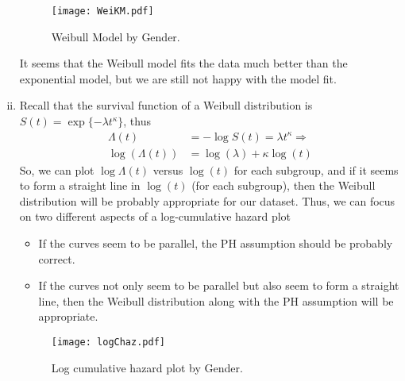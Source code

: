 \begin{enumerate}[(i)]
\begin{figure}[htbp]
	\centering
		\texttt{[image: WeiKM.pdf]}
	\caption{Weibull Model by Gender.}
	\label{figure2}
\end{figure}
It seems that the Weibull model fits the data much better than the exponential model, but we are still not happy with the model fit.
\item Recall that the survival function of a Weibull distribution is
$S(t) = \exp\{-\lambda t^{\kappa}\}$, thus
\begin{align}
\Lambda(t) &= - \log S(t) = \lambda t^{\kappa} \Rightarrow \nonumber \\
\log(\Lambda(t)) &= \log(\lambda) + \kappa\log(t) \nonumber
\end{align}
So, we can plot $\log\Lambda(t)$ versus $\log(t)$ for each subgroup, and if it seems to form a straight line in $\log(t)$ (for each subgroup), then the Weibull distribution will be probably appropriate
for our dataset. 
Thus, we can focus on two different aspects of a log-cumulative hazard plot
\begin{itemize}
\item If the curves seem to be parallel, the PH assumption should be probably correct.
\item If the curves not only seem to be parallel but also seem to form a straight line, then the Weibull distribution along with the PH assumption will be appropriate.
\end{itemize}
\begin{figure}[htbp]
	\centering
		\texttt{[image: logChaz.pdf]}
	\caption{Log cumulative hazard plot by Gender.}
	\label{figure3}
\end{figure}


\end{enumerate}
